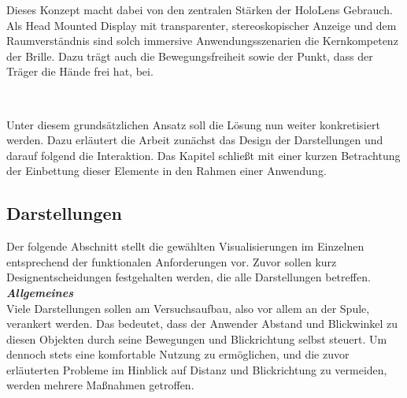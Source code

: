 Dieses Konzept macht dabei von den zentralen Stärken der HoloLens Gebrauch. Als Head Mounted Display mit transparenter, stereoskopischer Anzeige und dem Raumverständnis sind solch immersive Anwendungsszenarien die Kernkompetenz der Brille. Dazu trägt auch die Bewegungsfreiheit sowie der Punkt, dass der Träger die Hände frei hat, bei.

\vspace{8px}
\begin{center}
	\\
\end{center}
\vspace{6px}


Unter diesem grundsätzlichen Ansatz soll die Lösung nun weiter konkretisiert werden. Dazu erläutert die Arbeit zunächst das Design der Darstellungen und darauf folgend die Interaktion. Das Kapitel schließt mit einer kurzen Betrachtung der Einbettung dieser Elemente in den Rahmen einer Anwendung.

\subsection{Darstellungen}
Der folgende Abschnitt stellt die gewählten Visualisierungen im Einzelnen entsprechend der funktionalen Anforderungen vor. Zuvor sollen kurz Designentscheidungen festgehalten werden, die alle Darstellungen betreffen.\\

\textbf{\textit{Allgemeines}}\\
Viele Darstellungen sollen am Versuchsaufbau, also vor allem an der Spule, verankert werden. Das bedeutet, dass der Anwender Abstand und Blickwinkel zu diesen Objekten durch seine Bewegungen und Blickrichtung selbst steuert. Um dennoch stets eine komfortable Nutzung zu ermöglichen, und die zuvor erläuterten Probleme im Hinblick auf Distanz und Blickrichtung zu vermeiden, werden mehrere Maßnahmen getroffen.\\

